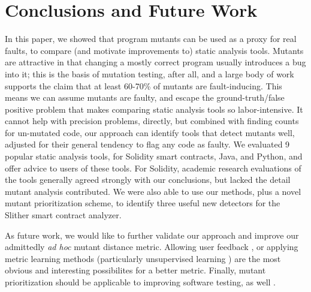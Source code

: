 \section{Conclusions and Future Work}

In this paper, we showed that program mutants can be used as a proxy
for real faults, to compare (and motivate improvements to) static
analysis tools.  Mutants are attractive in that changing a mostly
correct program usually introduces a bug into it; this is the basis of
mutation testing, after all, and a large body of work supports the
claim that at least 60-70\% of mutants are fault-inducing.   This
means we can assume mutants are faulty, and escape the
ground-truth/false positive problem that makes comparing static
analysis tools so labor-intensive.  It cannot help with precision
problems, directly, but combined with finding counts for un-mutated
code, our approach can identify tools that detect mutants well,
adjusted for their general tendency to flag any code as faulty.  We
evaluated 9 popular static analysis tools, for Solidity smart contracts, Java,
and Python, and offer advice to users of these tools.  For Solidity,
academic research evaluations of the tools generally agreed strongly
with our conclusions, but lacked the detail mutant analysis contributed.
We were also able to use our methods, plus a novel mutant prioritization scheme, to
identify three useful new detectors for the Slither smart contract
analyzer.

As future work, we would like to further validate our approach and
improve our admittedly \emph{ad hoc} mutant distance metric.  Allowing
user feedback \cite{EndUserMistake,OnlyOracle}, or applying metric
learning methods \cite{kulis2012metric} (particularly unsupervised
learning \cite{scholkopf1998nonlinear,tipping1999probabilistic}) are
the most obvious and interesting possibilites for a better metric.
Finally, mutant prioritization should be applicable to improving
software testing, as well \cite{groce2018verified}.